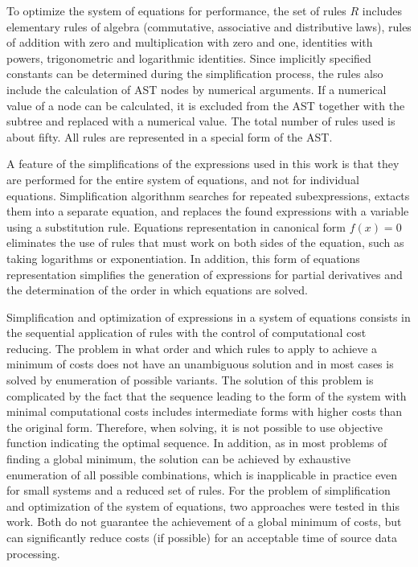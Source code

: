 \documentclass[lettersize,journal]{IEEEtran}
\begin{document}
To optimize the system of equations for performance, the set of rules \(R\) includes elementary rules of algebra (commutative, associative and distributive laws), 
rules of addition with zero and multiplication with zero and one, identities with powers, trigonometric and logarithmic identities. 
Since implicitly specified constants can be determined during the simplification process, the rules also include the calculation of AST nodes by numerical
arguments. If a numerical value of a node can be calculated, it is excluded from the AST together with the subtree and replaced with a numerical value. 
The total number of rules used is about fifty. All rules are represented in a special form of the AST.

A feature of the simplifications of the expressions used in this work is that they are performed for the entire system of equations, and not for
individual equations. Simplification algorithnm searches for repeated subexpressions, extacts them into a separate equation, and replaces the found
expressions with a variable using a substitution rule. Equations representation in canonical form \(f(x)=0\) eliminates the use of rules that must 
work on both sides of the equation, such as taking logarithms or exponentiation. In addition, this form of equations representation simplifies the
generation of expressions for partial derivatives and the determination of the order in which equations are solved.

Simplification and optimization of expressions in a system of equations consists in the sequential application of rules with the control of computational
cost reducing. The problem in what order and which rules to apply to achieve a minimum of costs does not have an unambiguous solution and in most cases
is solved by enumeration of possible variants. The solution of this problem is complicated by the fact that the sequence leading to the form of 
the system with minimal computational costs includes intermediate forms with higher costs than the original form. Therefore, when solving, it 
is not possible to use objective function indicating the optimal sequence. In addition, as in most problems of finding a global minimum, 
the solution can be achieved by exhaustive enumeration of all possible combinations, which is inapplicable in practice even for small systems and a
reduced set of rules. For the problem of simplification and optimization of the system of equations, two approaches were tested in this work. 
Both do not guarantee the achievement of a global minimum of costs, but can significantly reduce costs (if possible) for an acceptable time of
source data processing.
\end{document}

